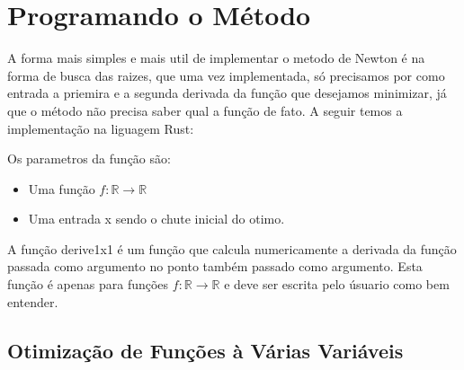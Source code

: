 \section{{Programando o Método}}

\hspace{0.8cm}

A forma mais simples e mais util de implementar o metodo de Newton é na forma
de busca das raizes, que uma vez  implementada, só precisamos por como entrada
a priemira e a segunda derivada da função que desejamos minimizar, já que o
método não precisa saber qual a função de fato. A seguir temos a implementação
na liguagem Rust:



Os parametros da função são:

    \begin{itemize}
            \item Uma função \(f : \mathbb{R} \rightarrow \mathbb{R}\)
            \item Uma entrada x sendo o chute inicial do otimo.
    \end{itemize}


A função derive1x1 é um função que calcula numericamente a derivada da função
passada como argumento no ponto também passado como argumento. Esta função é
apenas para funções \(f : \mathbb{R} \rightarrow \mathbb{R}\) e deve ser escrita
pelo úsuario como bem entender.



\textcolor[rgb]{1,0,0}{\section{{Otimização de Funções à Várias Variáveis}}}

\hspace{0.8cm}





%
